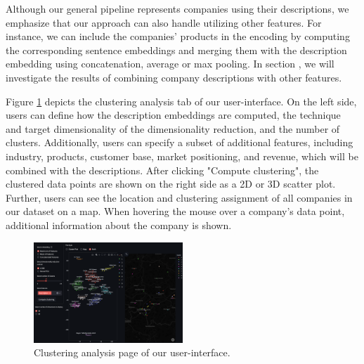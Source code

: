 \documentclass[conference]{IEEEtran}
\begin{document}
Although our general pipeline represents companies using their descriptions, we emphasize that our approach can also handle utilizing other features. For instance, we can include the companies' products in the encoding by computing the corresponding sentence embeddings and merging them with the description embedding using concatenation, average or max pooling. In section \MakeUppercase{}, we will investigate the results of combining company descriptions with other features.

Figure \ref{fig:clustering-analysis} depicts the clustering analysis tab of our user-interface. On the left side, users can define how the description embeddings are computed, the technique and target dimensionality of the dimensionality reduction, and the number of clusters. Additionally, users can specify a subset of additional features, including industry, products, customer base, market positioning, and revenue, which will be combined with the descriptions. After clicking "Compute clustering", the clustered data points are shown on the right side as a 2D or 3D scatter plot. Further, users can see the location and clustering assignment of all companies in our dataset on a map. When hovering the mouse over a company's data point, additional information about the company is shown.

\begin{figure}[H]
	\centering
	\includegraphics[width=0.5\textwidth]{figures/clustering_analysis.png}
	\caption{Clustering analysis page of our user-interface.}
	\label{fig:clustering-analysis}
\end{figure}
\end{document}
